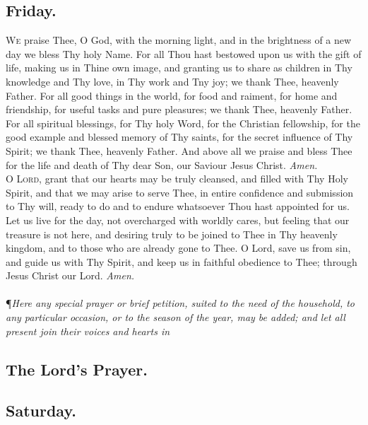 \subsection*{Friday.} 

\lettrine{W}{e} praise Thee, O God, with the morning light, and in
the brightness of a new day we bless Thy holy Name.
For all Thou hast bestowed upon us with the gift of life,
making us in Thine own image, and granting us to share
as children in Thy knowledge and Thy love, in Thy work
and Tny joy; we thank Thee, heavenly Father. For all
good things in the world, for food and raiment, for home
and friendship, for useful tasks and pure pleasures; we
thank Thee, heavenly Father. For all spiritual blessings,
for Thy holy Word, for the Christian fellowship, for the good
example and blessed memory of Thy saints, for the secret
influence of Thy Spirit; we thank Thee, heavenly Father.
And above all we praise and bless Thee for the life and
death of Thy dear Son, our Saviour Jesus Christ.
\textit{Amen.} \\

\lettrine{O}{ Lord,} grant that our hearts may be truly cleansed,
and filled with Thy Holy Spirit, and that we may arise
to serve Thee, in entire confidence and submission to Thy
will, ready to do and to endure whatsoever Thou hast appointed for us. Let us live for the day, not overcharged
with worldly cares, but feeling that our treasure is not
here, and desiring truly to be joined to Thee in Thy heavenly kingdom, and to those who are already gone to Thee.
O Lord, save us from sin, and guide us with Thy Spirit,
and keep us in faithful obedience to Thee; through Jesus
Christ our Lord.
\textit{Amen.} \\ \\

\noindent\P\textit{Here any special prayer or brief petition, suited to the need of the household, to any particular occasion, or to the season of the
year, may be added; and let all present join their voices and
hearts in}

\subsection*{The Lord's Prayer.}

\subsection*{Saturday.}

